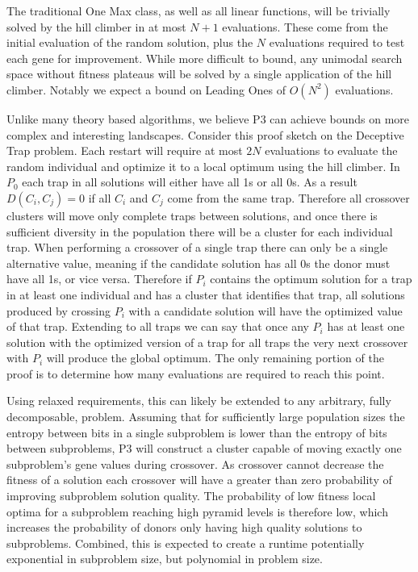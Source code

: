 \documentclass{sig-alternate}
\begin{document}
The traditional One Max class, as well as all linear functions, will be
trivially solved by the hill climber in at most $N+1$ evaluations.  These come
from the initial evaluation of the random solution, plus the $N$ evaluations required
to test each gene for improvement.  While more difficult to bound, any unimodal
search space without fitness plateaus will be solved by a single application
of the hill climber.  Notably we expect a bound on Leading Ones of $O(N^2)$ evaluations.

Unlike many theory based algorithms, we believe P3 can achieve bounds on more
complex and interesting landscapes.  Consider this proof sketch on the Deceptive
Trap problem.  Each restart will require at most $2N$ evaluations to evaluate the
random individual and optimize it to a local optimum using the hill climber.  In
$P_0$ each trap in all solutions will either have all 1s or all 0s.  As a result $D(C_i, C_j) = 0$
if all $C_i$ and $C_j$ come from the same trap.  Therefore all crossover clusters
will move only complete traps between solutions, and once there is sufficient
diversity in the population there will be a cluster for each individual trap.
When performing a crossover of a single trap there can only be a single alternative
value, meaning if the candidate solution has all 0s the donor must have all 1s, or vice
versa.  Therefore if $P_i$ contains the optimum solution for a trap in at least one
individual and has a cluster that identifies that trap, all solutions produced by crossing
$P_i$ with a candidate solution will have the optimized value of that trap.  Extending to
all traps we can say that once any $P_i$ has at least one solution with the optimized
version of a trap for all traps the very next crossover with $P_i$ will produce the global optimum.
The only remaining portion of the proof is to determine how many evaluations are required to reach this point.

Using relaxed requirements, this can likely be extended to any arbitrary, fully decomposable,
problem. Assuming that for sufficiently large population sizes the entropy between
bits in a single subproblem is lower than the entropy of bits between subproblems,
P3 will construct a cluster capable of moving exactly one subproblem's gene values
during crossover.  As crossover cannot decrease the fitness of a solution each
crossover will have a greater than zero probability of improving subproblem solution quality.
The probability of low fitness local optima for a subproblem reaching high pyramid levels
is therefore low, which increases the probability of donors only having high quality
solutions to subproblems.  Combined, this is expected to create a runtime potentially
exponential in subproblem size, but polynomial in problem size.
\end{document}
